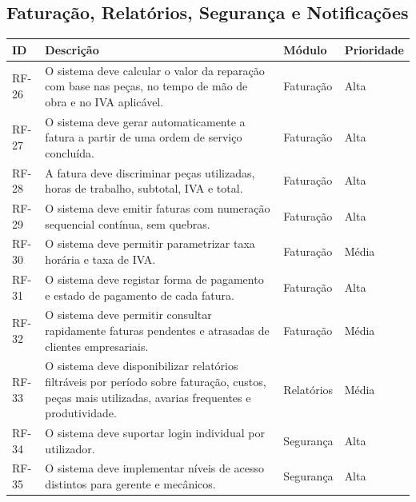 \documentclass[a4paper,12pt]{scrreprt}
\begin{document}
        \subsection{Faturação, Relatórios, Segurança e Notificações}
        \begin{table}[H]
            \centering
            \small
            \begin{tabular}{|p{1.4cm}|p{8.9cm}|p{2.5cm}|p{2.1cm}|}
                \hline
                \rowcolor{gray!20!white}
                \textbf{ID} & \textbf{Descrição} & \textbf{Módulo} & \textbf{Prioridade} \\
                \hline
                RF-26 & O sistema deve calcular o valor da reparação com base nas peças, no tempo de mão de obra e no IVA aplicável. & Faturação & Alta \\
                \hline
                RF-27 & O sistema deve gerar automaticamente a fatura a partir de uma ordem de serviço concluída. & Faturação & Alta \\
                \hline
                RF-28 & A fatura deve discriminar peças utilizadas, horas de trabalho, subtotal, IVA e total. & Faturação & Alta \\
                \hline
                RF-29 & O sistema deve emitir faturas com numeração sequencial contínua, sem quebras. & Faturação & Alta \\
                \hline
                RF-30 & O sistema deve permitir parametrizar taxa horária e taxa de IVA. & Faturação & Média \\
                \hline
                RF-31 & O sistema deve registar forma de pagamento e estado de pagamento de cada fatura. & Faturação & Alta \\
                \hline
                RF-32 & O sistema deve permitir consultar rapidamente faturas pendentes e atrasadas de clientes empresariais. & Faturação & Média \\
                \hline
                RF-33 & O sistema deve disponibilizar relatórios filtráveis por período sobre faturação, custos, peças mais utilizadas, avarias frequentes e produtividade. & Relatórios & Média \\
                \hline
                RF-34 & O sistema deve suportar login individual por utilizador. & Segurança & Alta \\
                \hline
                RF-35 & O sistema deve implementar níveis de acesso distintos para gerente e mecânicos. & Segurança & Alta \\

\end{tabular}
\end{table}
\end{document}
